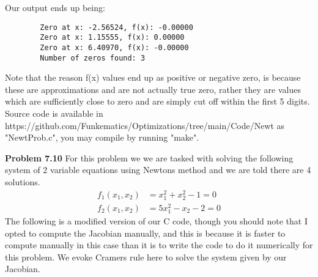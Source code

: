 \documentclass{article}
\begin{document}
Our output ends up being:
\begin{lstlisting}
        Zero at x: -2.56524, f(x): -0.00000
        Zero at x: 1.15555, f(x): 0.00000
        Zero at x: 6.40970, f(x): -0.00000
        Number of zeros found: 3
\end{lstlisting}
Note that the reason f(x) values end up as positive or negative zero, is because these are approximations and are not actually true zero, rather they are values which are sufficiently close to zero and are simply cut off within the first 5 digits. Source code is available in https://github.com/Funkematics/Optimizations/tree/main/Code/Newt as "NewtProb.c", you may compile by running "make".

\textbf{Problem 7.10} For this problem we we are tasked with solving the following system of 2 variable equations using Newtons method and we are told there are 4 solutions. 
\begin{align*}
    f_1(x_1,x_2) & = x_1^2 + x_2^2 - 1 = 0 \\
    f_2(x_1,x_2) & = 5x_1^2 - x_2 - 2 = 0
\end{align*}
The following is a modified version of our C code, though you should note that I opted to compute the Jacobian manually, and this is because it is faster to compute manually in this case than it is to write the code to do it numerically for this problem. We evoke Cramers rule here to solve the system given by our Jacobian.
\end{document}
